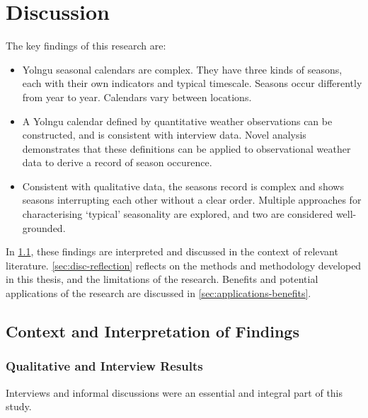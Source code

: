 \chapter{Discussion}
\label{ch:discussion}

The key findings of this research are:
\begin{itemize}
\item Yolngu seasonal calendars are complex.  They have three kinds of
    seasons, each with their own indicators and typical timescale.  Seasons
    occur differently from year to year.  Calendars vary between locations.

\item A Yolngu calendar defined by quantitative weather observations can be constructed,
    and is consistent with interview data.  Novel analysis demonstrates that
    these definitions can be applied to observational weather data to derive
    a record of season occurence.

\item Consistent with qualitative data, the seasons record is complex and
    shows seasons interrupting each other without a clear order.  Multiple
    approaches for characterising `typical' seasonality are explored, and
    two are considered well-grounded.
\end{itemize}

In \cref{sec:disc-results}, these findings are interpreted and discussed in
the context of relevant literature.  \cref{sec:disc-reflection} reflects on
the methods and methodology developed in this thesis, and the limitations
of the research.  Benefits and potential applications of the research are
discussed in \cref{sec:applications-benefits}.


\section{Context and Interpretation of Findings}
\label{sec:disc-results}

\subsection{Qualitative and Interview Results}

Interviews and informal discussions were an essential and integral part of
this study.

